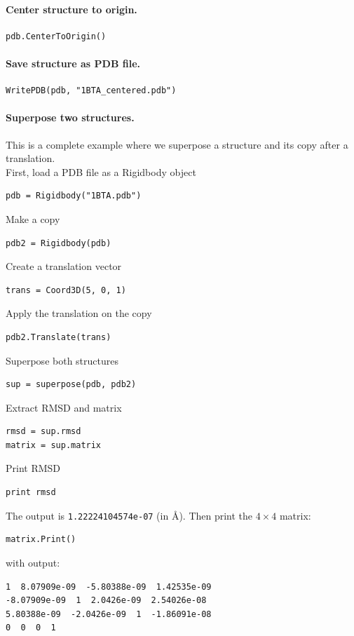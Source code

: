 \documentclass[12pt,a4paper]{article}
\begin{document}
\paragraph{Center structure to origin.}
\begin{verbatim}
pdb.CenterToOrigin()
\end{verbatim}

\paragraph{Save structure as PDB file.}
\begin{verbatim}
WritePDB(pdb, "1BTA_centered.pdb")
\end{verbatim}

\paragraph{Superpose two structures.} This is a complete example where we
superpose a structure and its copy after a translation.\\

\noindent
First, load a PDB file as a Rigidbody object
\begin{verbatim}
pdb = Rigidbody("1BTA.pdb")
\end{verbatim}
Make a copy
\begin{verbatim}
pdb2 = Rigidbody(pdb)
\end{verbatim}
Create a translation vector
\begin{verbatim}
trans = Coord3D(5, 0, 1)
\end{verbatim}
Apply the translation on the copy
\begin{verbatim}
pdb2.Translate(trans)
\end{verbatim}
Superpose both structures
\begin{verbatim}
sup = superpose(pdb, pdb2)
\end{verbatim}
Extract RMSD and matrix
\begin{verbatim}
rmsd = sup.rmsd
matrix = sup.matrix
\end{verbatim}
Print RMSD
\begin{verbatim}
print rmsd
\end{verbatim}
The output is {\tt 1.22224104574e-07} (in \AA). Then print the $4 \times 4$ matrix:
\begin{verbatim}
matrix.Print()
\end{verbatim}
with output:
\begin{verbatim}
1  8.07909e-09  -5.80388e-09  1.42535e-09  
-8.07909e-09  1  2.0426e-09  2.54026e-08  
5.80388e-09  -2.0426e-09  1  -1.86091e-08  
0  0  0  1  
\end{verbatim}
\end{document}

